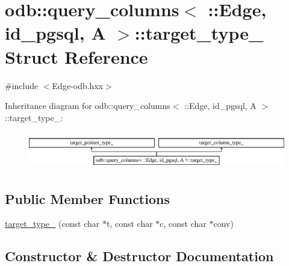 \hypertarget{structodb_1_1query__columns_3_01_1_1_edge_00_01id__pgsql_00_01_a_01_4_1_1target__type__}{}\section{odb\+:\+:query\+\_\+columns$<$ \+:\+:Edge, id\+\_\+pgsql, A $>$\+:\+:target\+\_\+type\+\_\+ Struct Reference}
\label{structodb_1_1query__columns_3_01_1_1_edge_00_01id__pgsql_00_01_a_01_4_1_1target__type__}


{\ttfamily \#include $<$Edge-\/odb.\+hxx$>$}

Inheritance diagram for odb\+:\+:query\+\_\+columns$<$ \+:\+:Edge, id\+\_\+pgsql, A $>$\+:\+:target\+\_\+type\+\_\+\+:\begin{figure}[H]
\begin{center}
\leavevmode
\includegraphics[height=1.647059cm]{da/d41/structodb_1_1query__columns_3_01_1_1_edge_00_01id__pgsql_00_01_a_01_4_1_1target__type__}
\end{center}
\end{figure}
\subsection*{Public Member Functions}
\begin{DoxyCompactItemize}
\item 
\hyperlink{structodb_1_1query__columns_3_01_1_1_edge_00_01id__pgsql_00_01_a_01_4_1_1target__type___af9cabc792cee6dbec866eeb6209b6c46}{target\+\_\+type\+\_\+} (const char $\ast$t, const char $\ast$c, const char $\ast$conv)
\end{DoxyCompactItemize}


\subsection{Constructor \& Destructor Documentation}
\hypertarget{structodb_1_1query__columns_3_01_1_1_edge_00_01id__pgsql_00_01_a_01_4_1_1target__type___af9cabc792cee6dbec866eeb6209b6c46}{}
